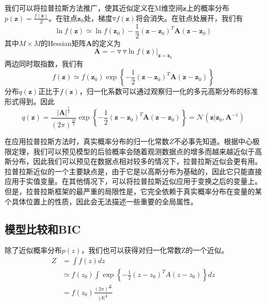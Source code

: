 我们可以将拉普拉斯方法推广，使其近似定义在M维空间$\boldsymbol{z}$上的概率分布$p(\boldsymbol{z})=\frac{f(\boldsymbol{z})}{Z}$。在驻点$\boldsymbol{z}_0$处，梯度$\triangledown f(\boldsymbol{z})$将会消失。在驻点处展开，我们有
\begin{equation}
	\ln f(\boldsymbol{z})\simeq \ln f(\boldsymbol{z}_0)-\frac{1}{2}(\boldsymbol{z}-\boldsymbol{z}_0)^T\boldsymbol{A}(\boldsymbol{z}-\boldsymbol{z}_0)
\end{equation}
其中$M\times M$的Hessian矩阵$\boldsymbol{A}$的定义为
\begin{equation}
	\boldsymbol{A}=-\triangledown\triangledown \ln f(\boldsymbol{z})|_{\boldsymbol{z}=\boldsymbol{z}_0}
\end{equation}
两边同时取指数，我们有
\begin{equation}
	f(\boldsymbol{z})\simeq f(\boldsymbol{z}_0)\exp\left\{-\frac{1}{2}(\boldsymbol{z}-\boldsymbol{z}_0)^T\boldsymbol{A}(\boldsymbol{z}-\boldsymbol{z}_0) \right\}
\end{equation}
分布$q(\boldsymbol{z})$正比于$f(\boldsymbol{z})$，归一化系数可以通过观察归一化的多元高斯分布的标准形式得到。因此
\begin{equation}
	q(\boldsymbol{z})=\frac{|\boldsymbol{A}|^{\frac{1}{2}}}{(2\pi)^{\frac{M}{2}}}\exp\left\{-\frac{1}{2}(\boldsymbol{z}-\boldsymbol{z}_0)^T\boldsymbol{A}(\boldsymbol{z}-\boldsymbol{z}_0) \right\}=\mathcal{N}(\boldsymbol{z}|\boldsymbol{z}_0,\boldsymbol{A}^{-1})
\end{equation}

在应用拉普拉斯方法时，真实概率分布的归一化常数$Z$不必事先知道。根据中心极限定理，我们可以预见模型的后验概率会随着观测数据点的增多而越来越近似于高斯分布，因此我们可以预见在数据点相对较多的情况下，拉普拉斯近似会更有用。拉普拉斯近似的一个主要缺点是，由于它是以高斯分布为基础的，因此它只能直接应用于实值变量。在其他情况下，可以将拉普拉斯近似应用于变换之后的变量上。但是，拉普拉斯框架的最严重的局限性是，它完全依赖于真实概率分布在变量的某个具体位置上的性质，因此会无法描述一些重要的全局属性。
\subsection*{模型比较和BIC}
除了近似概率分布$p(z)$，我们也可以获得对归一化常数Z的一个近似。
\begin{equation}
\label{dada}
	\begin{aligned}
	   Z&=\int f(z)dz\\
		&\simeq f(z_0)\int \exp\left\{-\frac{1}{2}(z-z_0)^TA(z-z_0) \right\}dz\\
		&=f(z_0)\frac{(2\pi)^{\frac{M}{2}}}{|A|^{\frac{1}{2}}}
	\end{aligned}
\end{equation}

